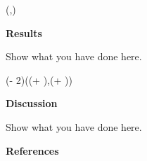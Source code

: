 \documentclass[dark]{cgem-poster}
\begin{document}
  \begin{textblock*}{\PosterColumnTwoTextWidth{}}(\PosterColumnTwoTextLeft{},\PosterColumnTwoTextTop{})
    \begin{minipage}[t][\PosterColumnTwoTextHeight{}][t]{\PosterColumnTwoTextWidth{}}
      \vspace{5mm}
      \begin{center}
        \large
        \textbf{Results}
      \end{center}

      \vspace{5mm}
      \small
      Show what you have done here.

    \end{minipage}
  \end{textblock*}

  \newcommand{\PosterColumnThreeTextLeft}{\dimexpr (\PosterColumnThreeLeft + \PosterTextMarginSize)\relax}
  \newcommand{\PosterColumnThreeTextWidth}{\dimexpr (\PosterColumnThreeWidth - 2\PosterTextMarginSize)\relax}
  \newcommand{\PosterColumnThreeTextTop}{\dimexpr (\PosterColumnThreeTop + \PosterTextMarginSize)\relax}
  \newcommand{\PosterColumnThreeTextHeight}{\dimexpr (\PosterColumnThreeHeight - 2\PosterTextMarginSize)\relax}

  \begin{textblock*}{\PosterColumnThreeTextWidth{}}(\PosterColumnThreeTextLeft{},\PosterColumnThreeTextTop{})
    \begin{minipage}[t][\PosterColumnThreeTextHeight{}][t]{\PosterColumnThreeTextWidth{}}
      \vspace{5mm}
      \begin{center}
        \large
        \textbf{Discussion}
      \end{center}

      \vspace{5mm}
      \small
      Show what you have done here.

      \vspace{51.5cm}
      \PosterColumnHorizontalBar{}
      \begin{center}
        \large
        \textbf{References}
      \end{center}

      \renewcommand*{\bibfont}{\small}
      \printbibliography
    
    \end{minipage}
  \end{textblock*}
\end{document}
